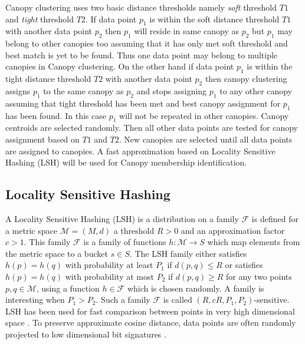 \documentclass[10pt, conference, compsocconf]{IEEEtran}
\begin{document}
Canopy clustering uses two basic distance thresholds namely \textit{soft} threshold $T1$ and \textit{tight} threshold $T2$. If data point $p_1$ is within the soft distance threshold $T1$ with another data point $p_2$ then $p_1$ will reside in same canopy as $p_2$ but $p_1$ may belong to other canopies too assuming that it has only met soft threshold and best match is yet to be found. Thus one data point may belong to multiple canopies in Canopy clustering. On the other hand if data point $p_1$ is within the tight distance threshold $T2$ with another data point $p_2$ then canopy clustering assigns $p_1$ to the same canopy as $p_2$ and stops assigning $p_1$ to any other canopy assuming that tight threshold has been met and best canopy assignment for $p_1$ has been found. In this case $p_1$ will not be repeated in other canopies. Canopy centroids are selected randomly. Then all other data points are tested for canopy assignment based on $T1$ and $T2$. New canopies are selected until all data points are assigned to canopies. A fast approximation based on Locality Sensitive Hashing (LSH) will be used for Canopy membership identification.


\subsection{Locality Sensitive Hashing}

A Locality Sensitive Hashing (LSH) \cite{MARLshRef1}\cite{MARLshRef2}\cite{MARLshRef3} is a distribution on a family ${\displaystyle {\mathcal {F}}}$ is defined for a metric space ${\displaystyle {\mathcal{M}}=(M,d)}$ a threshold ${\displaystyle R>0}$ and an approximation factor ${\displaystyle c>1}$. This family ${\displaystyle {\mathcal {F}}}$ is a family of functions ${\displaystyle h:{\mathcal {M}}\to S}$ which map elements from the metric space to a bucket ${\displaystyle s\in S}$. The LSH family either satisfies ${\displaystyle h(p)=h(q)}$ with probability at least ${\displaystyle P_{1}}$ if ${\displaystyle d(p,q)\leq R}$ or satisfies ${\displaystyle h(p)=h(q)}$ with probability at most ${\displaystyle P_{2}}$ if ${\displaystyle d(p,q)\geq R}$ for any two points ${\displaystyle p,q\in {\mathcal {M}}}$, using a function ${\displaystyle h\in {\mathcal {F}}}$ which is chosen randomly. A family is interesting when ${\displaystyle P_{1}>P_{2}}$. Such a family ${\displaystyle {\mathcal {F}}}$ is called ${\displaystyle (R,cR,P_{1},P_{2})}$-sensitive. LSH has been used for fast comparison between points in very high dimensional space \cite{MARLshRef3}. To preserve approximate cosine distance, data points are often randomly projected to low dimensional bit signatures \cite{MARLshRef4}.
\end{document}
